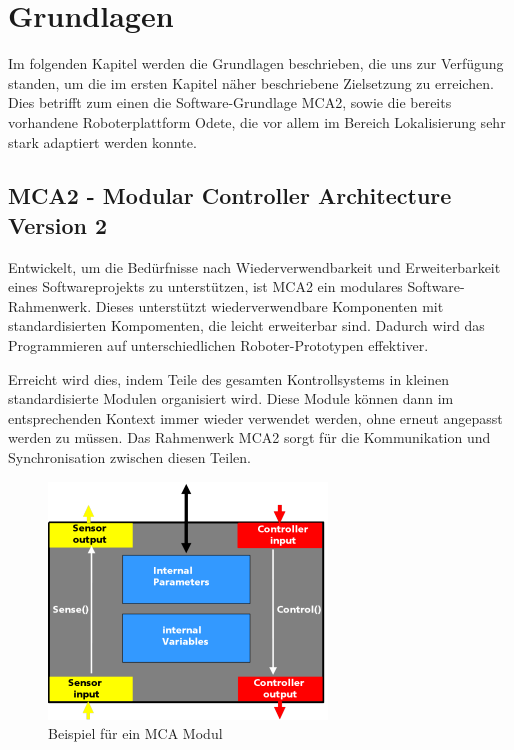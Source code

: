 \chapter{Grundlagen}
\label{grundlagen_cha}

Im folgenden Kapitel werden die Grundlagen beschrieben, die uns zur Verfügung standen, um die im ersten Kapitel näher beschriebene Zielsetzung zu erreichen. Dies betrifft zum einen die
Software-Grundlage MCA2, sowie die bereits vorhandene Roboterplattform Odete, die vor allem im Bereich Lokalisierung sehr stark adaptiert werden konnte.

\section{MCA2 - Modular Controller Architecture Version 2}
\authorsection{\editoranne}

Entwickelt, um die Bedürfnisse nach Wiederverwendbarkeit und Erweiterbarkeit eines Softwareprojekts zu unterstützen, ist MCA2 ein modulares Software-Rahmenwerk. Dieses unterstützt wiederverwendbare Komponenten mit standardisierten Kompomenten, die leicht erweiterbar sind. Dadurch wird das Programmieren auf unterschiedlichen Roboter-Prototypen effektiver.

Erreicht wird dies, indem Teile des gesamten Kontrollsystems in kleinen standardisierte Modulen organisiert wird. Diese Module können dann im entsprechenden Kontext immer wieder verwendet werden, ohne erneut angepasst werden zu müssen. Das Rahmenwerk MCA2 sorgt für die Kommunikation und Synchronisation zwischen diesen Teilen.

\begin{figure}[h]
	\center
	\includegraphics{graphics/mcamodule.png}
	\caption{\label{fig:MCA-Modul} Beispiel für ein MCA Modul}
\end{figure}


